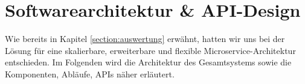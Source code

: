\chapter{Softwarearchitektur \& API-Design}\label{chap:Softwarearchitektur API-Design}

Wie bereits in Kapitel \ref{section:auswertung} erwähnt, hatten wir uns bei der Lösung für eine skalierbare, erweiterbare und flexible Microservice-Architektur entschieden. Im Folgenden wird die Architektur des Gesamtsystems sowie die Komponenten, Abläufe, APIs näher erläutert.


\newpage

\newpage

\newpage

\newpage

\newpage


